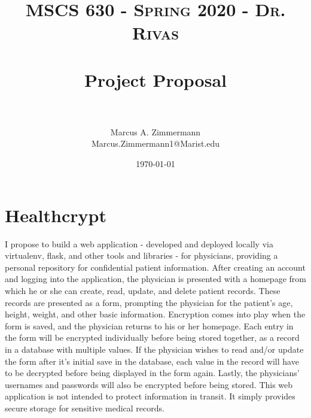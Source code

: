 \documentclass[letterpaper, 10pt,DIV=13]{scrartcl}
\title{	
   \normalfont \normalsize
   \textsc{MSCS 630 - Spring 2020 - Dr. Rivas} \\ [10pt] %
   \horrule{0.5pt} \\[0.25cm] 	%
   \huge Project Proposal  \\     	    %
   \horrule{0.5pt} \\[0.25cm] 	%
}
\author{Marcus A. Zimmermann \\ \normalsize Marcus.Zimmermann1@Marist.edu}
\date{\normalsize\today} 	%
\begin{document}
\maketitle %

\section*{Healthcrypt}

\begin{spacing}{1.25}
I propose to build a web application - developed and deployed locally via virtualenv, flask, and other tools and libraries - for physicians, providing a personal repository for confidential patient information. After creating an account and logging into the application, the physician is presented with a homepage from which he or she can create, read, update, and delete patient records. These records are presented as a form, prompting the physician for the patient's age, height, weight, and other basic information. Encryption comes into play when the form is saved, and the physician returns to his or her homepage. Each entry in the form will be encrypted individually before being stored together, as a record in a database with multiple values. If the physician wishes to read and/or update the form after it's initial save in the database, each value in the record will have to be decrypted before being displayed in the form again. Lastly, the physicians' usernames and passwords will also be encrypted before being stored. This web application is not intended to protect information in transit. It simply provides secure storage for sensitive medical records.
\end{spacing}
\end{document}
